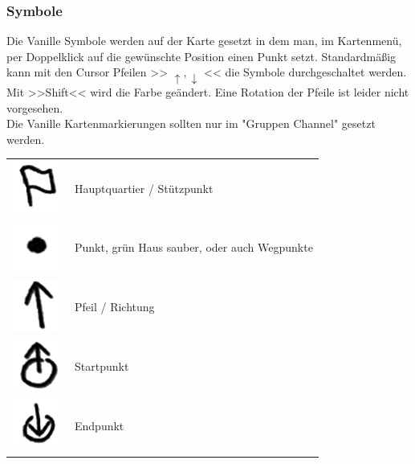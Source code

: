 \newpage

\subsubsection{Symbole}
	Die Vanille Symbole werden auf der Karte gesetzt in dem man, im Kartenmenü, per Doppelklick auf die gewünschte Position einen Punkt setzt. Standardmäßig kann mit den Cursor Pfeilen >> \begin{math} \uparrow,\downarrow \end{math} << die Symbole durchgeschaltet werden. Mit >>Shift<< wird die Farbe geändert. Eine Rotation der Pfeile ist leider nicht vorgesehen. \\
	Die Vanille Kartenmarkierungen sollten nur im "Gruppen Channel" gesetzt werden.

\begin{longtable}{p{3cm} p{15cm}}
	\includegraphics[scale=1]{./Grafiken/KarteUndMarkierungen/HQ.png}			& 		Hauptquartier / Stützpunkt \\
	\includegraphics[scale=1]{./Grafiken/KarteUndMarkierungen/Punkt.png}			&		Punkt, grün Haus sauber, oder auch Wegpunkte \\
	\includegraphics[scale=1]{./Grafiken/KarteUndMarkierungen/Pfeil.png}			&		Pfeil / Richtung \\
	\includegraphics[scale=1]{./Grafiken/KarteUndMarkierungen/Start.png}			&		Startpunkt \\
	\includegraphics[scale=1]{./Grafiken/KarteUndMarkierungen/Endpunkt.png}		&		Endpunkt \\

\end{longtable}
